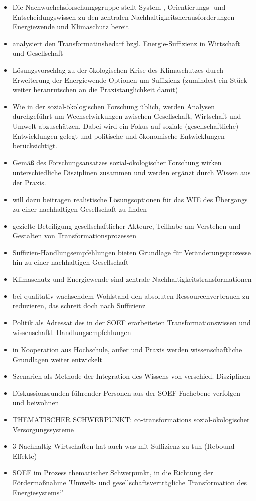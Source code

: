 \begin{itemize}
 \item Die Nachwuchchsforschungsgruppe stellt System-, Orientierungs- und Entscheidungswissen zu den zentralen Nachhaltigkeitsherausforderungen Energiewende und Klimaschutz bereit
 \item analysiert den Transformatinsbedarf bzgl. Energie-Suffizienz in Wirtschaft und Gesellschaft
 \item Lösungsvorschlag zu der ökologischen Krise des Klimaschutzes durch Erweiterung der Energiewende-Optionen um Suffizienz (zumindest ein Stück weiter heranrutschen an die Praxistauglichkeit damit)
 \item Wie in der sozial-ökologischen Forschung üblich, werden Analysen durchgeführt um Wechselwirkungen zwischen Gesellschaft, Wirtschaft und Umwelt abzuschätzen. Dabei wird ein Fokus auf soziale (gesellschaftliche) Entwicklungen gelegt und politische und ökonomische Entwicklungen berücksichtigt.
 \item Gemäß des Forschungsansatzes sozial-ökologischer Forschung wirken unterschiedliche Disziplinen zusammen und werden ergänzt durch Wissen aus der Praxis.
 \item will dazu beitragen realistische Lösungsoptionen für das WIE des Übergangs zu einer nachhaltigen Gesellschaft zu finden
 \item gezielte Beteiligung gesellschaftlicher Akteure, Teilhabe am Verstehen und Gestalten von Transformationsprozessen
 \item Suffizien-Handlungsempfehlungen bieten Grundlage für Veränderungsprozesse hin zu einer nachhaltigen Gesellschaft
 \item Klimaschutz und Energiewende sind zentrale Nachhaltigkeitstransformationen
 \item bei qualitativ wachsendem Wohlstand den absoluten Ressourcenverbrauch zu reduzieren, das schreit doch nach Suffizienz
 \item Politik als Adressat des in der SOEF erarbeiteten Transformationswissen und wissenschaftl. Handlungsempfehlungen
 \item in Kooperation aus Hochschule, außer und Praxis werden wissenschaftliche Grundlagen weiter entwickelt
 \item Szenarien als Methode der Integration des Wissens von verschied. Disziplinen
 \item Diskussionsrunden führender Personen aus der SOEF-Fachebene verfolgen und beiwohnen
 \item THEMATISCHER SCHWERPUNKT: co-transformations sozial-ökologischer Versorgungssysteme
 \item 3 Nachhaltig Wirtschaften hat auch was mit Suffizienz zu tun (Rebound-Effekte)
 \item SOEF im Prozess thematischer Schwerpunkt, in die Richtung der Fördermaßnahme 'Umwelt- und gesellschaftsverträgliche Transformation des Energiesystems`'
\end{itemize}

